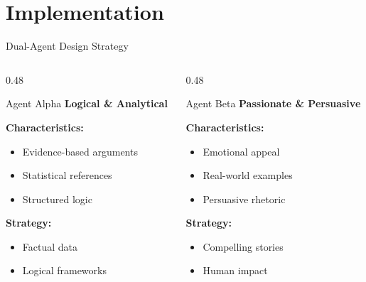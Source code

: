 \documentclass[aspectratio=169]{beamer}
\begin{document}
\section{Implementation}
\begin{frame}{Dual-Agent Design Strategy}
    \begin{columns}
        \begin{column}{0.48\textwidth}
            \begin{block}{Agent Alpha}
                \footnotesize
                \textbf{Logical \& Analytical}
                
                \textbf{Characteristics:}
                \begin{itemize}
                    \scriptsize
                    \item Evidence-based arguments
                    \item Statistical references
                    \item Structured logic
                \end{itemize}
                
                \textbf{Strategy:}
                \begin{itemize}
                    \scriptsize
                    \item Factual data
                    \item Logical frameworks
                \end{itemize}
            \end{block}
        \end{column}
        
        \begin{column}{0.48\textwidth}
            \begin{block}{Agent Beta}
                \footnotesize
                \textbf{Passionate \& Persuasive}
                
                \textbf{Characteristics:}
                \begin{itemize}
                    \scriptsize
                    \item Emotional appeal
                    \item Real-world examples
                    \item Persuasive rhetoric
                \end{itemize}
                
                \textbf{Strategy:}
                \begin{itemize}
                    \scriptsize
                    \item Compelling stories
                    \item Human impact
                \end{itemize}
            \end{block}
        \end{column}
    \end{columns}
    

\end{frame}
\end{document}
